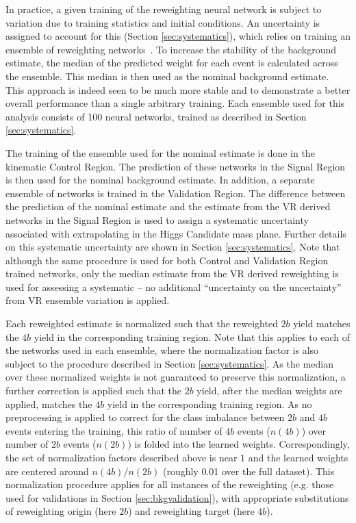 In practice, a given training of the reweighting neural network is subject to variation
due to training statistics and initial conditions. An uncertainty is assigned to account
for this (Section \ref{sec:systematics}), which relies on training an ensemble of
reweighting networks~\cite{DeepEnsembles}. To increase the stability of the background estimate,
the median of the predicted weight for each event is calculated across the ensemble.
This median is then used as the nominal background estimate. This approach is indeed 
seen to be much more stable and to demonstrate a better overall performance than a 
single arbitrary training. Each ensemble used for this analysis consists of 100 
neural networks, trained as described in Section \ref{sec:systematics}.

The training of the ensemble used for the nominal estimate is done in the kinematic
Control Region. The prediction of these networks in the Signal Region is then used
for the nominal background estimate. In addition, a separate ensemble of networks is 
trained in the Validation Region. The difference between the prediction of the nominal 
estimate and the estimate from the VR derived networks in the Signal Region is used to 
assign a systematic uncertainty associated with extrapolating in the Higgs Candidate
mass plane. Further details on this systematic uncertainty are shown in Section \ref{sec:systematics}.
Note that although the same procedure is used for both Control and Validation Region trained 
networks, only the median estimate from the VR derived reweighting is used for assessing a 
systematic -- no additional ``uncertainty on the uncertainty'' from 
VR ensemble variation is applied.

Each reweighted estimate is normalized such that the reweighted $2b$ yield matches the $4b$ 
yield in the corresponding training region. Note that this applies to each of the networks 
used in each ensemble, where the normalization factor is also subject to the procedure described 
in Section \ref{sec:systematics}. As the median over these normalized weights is not guaranteed 
to preserve this normalization, a further correction is applied such that the $2b$ yield, after 
the median weights are applied, matches the $4b$ yield in the corresponding training region. As no 
preprocessing is applied to correct for the class imbalance between $2b$ and $4b$ events entering 
the training, this ratio of number of $4b$ events ($n(4b)$) over number of $2b$ events ($n(2b)$) is 
folded into the learned weights. Correspondingly, the set of normalization factors described above is 
near $1$ and the learned weights are centered around $n(4b) / n(2b)$ (roughly 0.01 over the full dataset). 
This normalization procedure applies for all instances of the reweighting (e.g. those used for validations 
in Section \ref{sec:bkgvalidation}), with appropriate substitutions of reweighting origin 
(here $2b$) and reweighting target (here $4b$).

